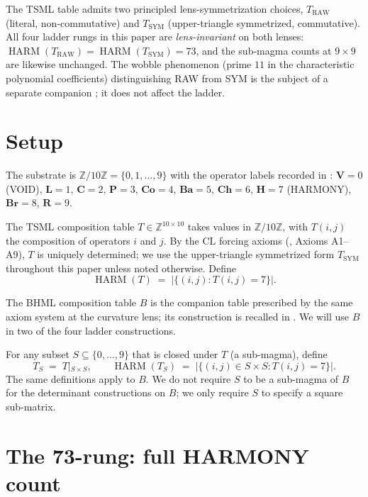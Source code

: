 \documentclass[11pt,reqno]{amsart}
\theoremstyle{definition}
\newcommand{\Z}{\mathbb{Z}}
\DeclareMathOperator{\HARM}{HARM}
\begin{document}
The TSML table admits two principled lens-symmetrization choices,
$T_{\mathrm{RAW}}$ (literal, non-commutative) and $T_{\mathrm{SYM}}$
(upper-triangle symmetrized, commutative). All four ladder rungs in
this paper are \emph{lens-invariant} on both lenses:
$\HARM(T_{\mathrm{RAW}}) = \HARM(T_{\mathrm{SYM}}) = 73$, and the
sub-magma counts at $9 \times 9$ are likewise unchanged. The wobble
phenomenon (prime $11$ in the characteristic polynomial coefficients)
distinguishing RAW from SYM is the subject of a separate
companion \cite{Sanders2026Wobble}; it does not affect the ladder.

\section{Setup}
\label{sec:setup}

The substrate is $\Z/10\Z = \{0, 1, \ldots, 9\}$ with the operator
labels recorded in \cite{Sanders2026CLAxioms}: $\mathbf{V} = 0$
(VOID), $\mathbf{L} = 1$, $\mathbf{C} = 2$, $\mathbf{P} = 3$,
$\mathbf{Co} = 4$, $\mathbf{Ba} = 5$, $\mathbf{Ch} = 6$, $\mathbf{H}
= 7$ (HARMONY), $\mathbf{Br} = 8$, $\mathbf{R} = 9$.

The TSML composition table $T \in \Z^{10 \times 10}$ takes values in
$\Z/10\Z$, with $T(i, j)$ the composition of operators $i$ and $j$.
By the CL forcing axioms (\cite{Sanders2026CLAxioms}, Axioms A1--A9),
$T$ is uniquely determined; we use the upper-triangle symmetrized
form $T_{\mathrm{SYM}}$ throughout this paper unless noted otherwise.
Define
\[
  \HARM(T) \;=\; |\{(i, j) : T(i, j) = 7\}|.
\]

The BHML composition table $B$ is the companion table prescribed by
the same axiom system at the curvature lens; its construction is
recalled in \cite{Sanders2026LensInvariance}. We will use $B$ in two
of the four ladder constructions.

For any subset $S \subseteq \{0, \ldots, 9\}$ that is closed under
$T$ (a sub-magma), define
\[
  T_S \;=\; T |_{S \times S},\qquad
  \HARM(T_S) \;=\; |\{(i, j) \in S \times S : T(i, j) = 7\}|.
\]
The same definitions apply to $B$. We do not require $S$ to be a
sub-magma of $B$ for the determinant constructions on $B$; we only
require $S$ to specify a square sub-matrix.

\section{The 73-rung: full HARMONY count}
\label{sec:73}
\end{document}
